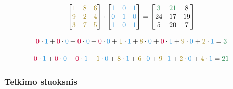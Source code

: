 \documentclass{VUMIFPSbakalaurinis}
\begin{document}
\begin{equation}\label{eq:convl}
\begin{bmatrix}
\textcolor{myyellow}{1} & \textcolor{myyellow}{8} & \textcolor{myyellow}{6} \\
\textcolor{myyellow}{9} & \textcolor{myyellow}{2} & \textcolor{myyellow}{4} \\
\textcolor{myyellow}{3} & \textcolor{myyellow}{7} & \textcolor{myyellow}{5}
\end{bmatrix}
\cdot
\begin{bmatrix}
\textcolor{myblue}{1} & \textcolor{myblue}{0} & \textcolor{myblue}{1} \\
\textcolor{myblue}{0} & \textcolor{myblue}{1} & \textcolor{myblue}{0} \\
\textcolor{myblue}{1} & \textcolor{myblue}{0} & \textcolor{myblue}{1}
\end{bmatrix}
=
\begin{bmatrix}
\textcolor{mygreen}{3} & \textcolor{mygreen}{21} & 8 \\
24 & 17 & 19 \\
5 & 20 & 7
\end{bmatrix}
\end{equation}

\begin{equation}\label{eq:convl1}
\textcolor{myred}{0} \cdot \textcolor{myblue}{1}+\textcolor{myred}{0} \cdot \textcolor{myblue}{0}+\textcolor{myred}{0} \cdot \textcolor{myblue}{0}+\textcolor{myred}{0} \cdot \textcolor{myblue}{0}+\textcolor{myyellow}{1} \cdot \textcolor{myblue}{1}+\textcolor{myyellow}{8} \cdot \textcolor{myblue}{0}+\textcolor{myred}{0} \cdot \textcolor{myblue}{1}+\textcolor{myyellow}{9} \cdot \textcolor{myblue}{0}+\textcolor{myyellow}{2} \cdot \textcolor{myblue}{1}=\textcolor{mygreen}{3}
\end{equation}


\begin{equation}\label{eq:convl2}
\textcolor{myred}{0} \cdot \textcolor{myblue}{1}+\textcolor{myred}{0} \cdot \textcolor{myblue}{0}+\textcolor{myred}{0} \cdot \textcolor{myblue}{1}+\textcolor{myyellow}{1} \cdot \textcolor{myblue}{0}+\textcolor{myyellow}{8} \cdot \textcolor{myblue}{1}+\textcolor{myyellow}{6} \cdot \textcolor{myblue}{0}+\textcolor{myyellow}{9} \cdot \textcolor{myblue}{1}+\textcolor{myyellow}{2} \cdot \textcolor{myblue}{0}+\textcolor{myyellow}{4} \cdot \textcolor{myblue}{1}=\textcolor{mygreen}{21}
\end{equation}

\subsubsection{Telkimo sluoksnis}
\end{document}
